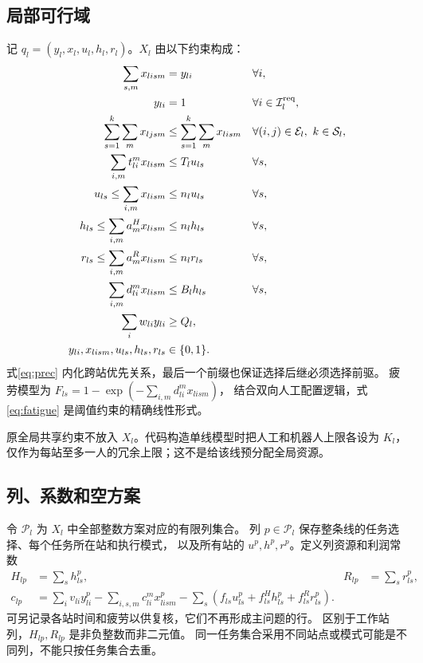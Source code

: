 \documentclass[UTF8,a4paper,11pt]{ctexart}
\begin{document}
\subsection{局部可行域}
记 $q_l=(y_l,x_l,u_l,h_l,r_l)$。$X_l$ 由以下约束构成：
\begin{align}
\sum_{s,m}x_{lism}&=y_{li} &&\forall i,\label{eq:assign}\\
y_{li}&=1 &&\forall i\in\mathcal I_l^{\rm req},\\
\sum_{s=1}^k\sum_m x_{ljsm}&\leq\sum_{s=1}^k\sum_m x_{lism}
 &&\forall(i,j)\in\mathcal E_l,\ k\in\mathcal S_l,\label{eq:prec}\\
\sum_{i,m}t_{li}^m x_{lism}&\leq T_lu_{ls} &&\forall s,\\
u_{ls}\leq\sum_{i,m}x_{lism}&\leq n_lu_{ls} &&\forall s,\\
h_{ls}\leq\sum_{i,m}a_m^H x_{lism}&\leq n_lh_{ls} &&\forall s,\\
r_{ls}\leq\sum_{i,m}a_m^R x_{lism}&\leq n_lr_{ls} &&\forall s,\\
\sum_{i,m}d_{li}^m x_{lism}&\leq B_lh_{ls} &&\forall s,\label{eq:fatigue}\\
\sum_i w_{li}y_{li}&\geq Q_l,\label{eq:recovery}\\
y_{li},x_{lism},u_{ls},h_{ls},r_{ls}&\in\{0,1\}.\label{eq:localbinary}
\end{align}
式\eqref{eq:prec} 内化跨站优先关系，最后一个前缀也保证选择后继必须选择前驱。
疲劳模型为 $F_{ls}=1-\exp(-\sum_{i,m}d_{li}^mx_{lism})$，
结合双向人工配置逻辑，式\eqref{eq:fatigue} 是阈值约束的精确线性形式。

原全局共享约束不放入 $X_l$。代码构造单线模型时把人工和机器人上限各设为
$K_l$，仅作为每站至多一人的冗余上限；这不是给该线预分配全局资源。

\subsection{列、系数和空方案}
令 $\mathcal P_l$ 为 $X_l$ 中全部整数方案对应的有限列集合。
列 $p\in\mathcal P_l$ 保存整条线的任务选择、每个任务所在站和执行模式，
以及所有站的 $u^p,h^p,r^p$。定义列资源和利润常数
\begin{align}
H_{lp}&=\sum_s h^p_{ls},& R_{lp}&=\sum_s r^p_{ls},\label{eq:features}\\
c_{lp}&=\sum_i v_{li}y^p_{li}-\sum_{i,s,m}c_{li}^mx^p_{lism}
-\sum_s(f_{ls}u^p_{ls}+f^H_{ls}h^p_{ls}+f^R_{ls}r^p_{ls}).\label{eq:profit}
\end{align}
可另记录各站时间和疲劳以供复核，它们不再形成主问题的行。
区别于工作站列，$H_{lp},R_{lp}$ 是非负整数而非二元值。
同一任务集合采用不同站点或模式可能是不同列，不能只按任务集合去重。
\end{document}

